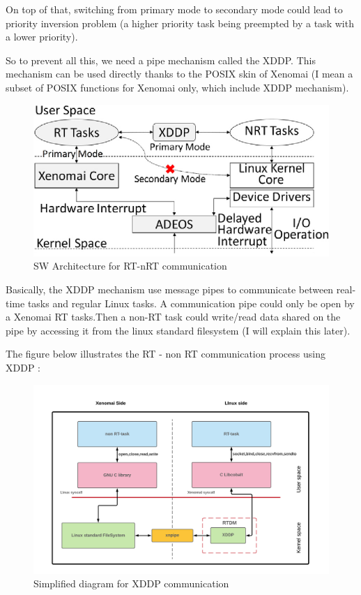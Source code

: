 \documentclass[12pt,hidelinks]{article}
\begin{document}
{    On top of that, switching from primary mode to secondary mode could lead to priority inversion problem (a higher priority task being preempted by a task with a lower priority).
    
    So to prevent all this, we need a pipe mechanism called the XDDP. This mechanism can be used directly thanks to the POSIX skin of Xenomai (I mean a subset of POSIX functions for Xenomai only, which include XDDP mechanism).
    
    \begin{figure}[ht]
    \centering
	\includegraphics[scale=0.7]{SW.png}
	\caption{SW Architecture for RT-nRT  communication}
	\end{figure} \newline
    
    Basically, the XDDP mechanism use message pipes to communicate between real-time tasks and regular Linux tasks. A communication pipe could only be open by a Xenomai RT tasks.Then a non-RT task could write/read data shared on the pipe by accessing it from the linux standard filesystem (I will explain this later).
    
    The figure below illustrates the RT - non RT communication process using XDDP :
    \begin{figure}[ht]
	\includegraphics[scale=0.25]{XDDPcom.png}
	\caption{Simplified diagram for XDDP communication}
	\end{figure} \newline
	
}
\end{document}
